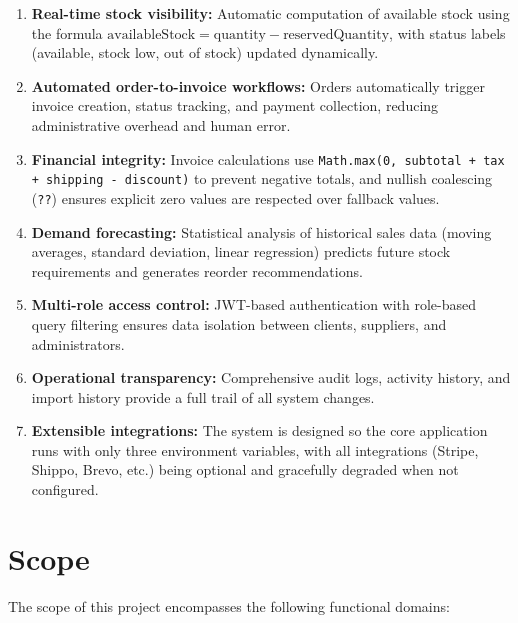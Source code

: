 \documentclass[12pt,a4paper]{report}
\begin{document}
\begin{enumerate}[leftmargin=1.5em]
  \item \textbf{Real-time stock visibility:} Automatic computation of available stock using the formula $\text{availableStock} = \text{quantity} - \text{reservedQuantity}$, with status labels (available, stock low, out of stock) updated dynamically.
  \item \textbf{Automated order-to-invoice workflows:} Orders automatically trigger invoice creation, status tracking, and payment collection, reducing administrative overhead and human error.
  \item \textbf{Financial integrity:} Invoice calculations use \texttt{Math.max(0, subtotal + tax + shipping - discount)} to prevent negative totals, and nullish coalescing (\texttt{??}) ensures explicit zero values are respected over fallback values.
  \item \textbf{Demand forecasting:} Statistical analysis of historical sales data (moving averages, standard deviation, linear regression) predicts future stock requirements and generates reorder recommendations.
  \item \textbf{Multi-role access control:} JWT-based authentication with role-based query filtering ensures data isolation between clients, suppliers, and administrators.
  \item \textbf{Operational transparency:} Comprehensive audit logs, activity history, and import history provide a full trail of all system changes.
  \item \textbf{Extensible integrations:} The system is designed so the core application runs with only three environment variables, with all integrations (Stripe, Shippo, Brevo, etc.) being optional and gracefully degraded when not configured.
\end{enumerate}

\section{Scope}

The scope of this project encompasses the following functional domains:
\end{document}

